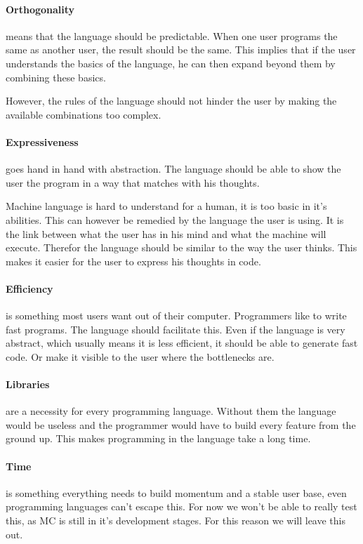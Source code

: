 \begin{multicols}{2}
   \paragraph{Orthogonality}
   means that the language should be predictable.
   When one user programs the same as another user, the result should be the same.
   This implies that if the user understands the basics of the language, he can then expand beyond them by combining these basics.

   However, the rules of the language should not hinder the user by making the available combinations too complex.

   \paragraph{Expressiveness}
   goes hand in hand with abstraction.
   The language should be able to show the user the program in a way that matches with his thoughts.

   Machine language is hard to understand for a human, it is too basic in it's abilities.
   This can however be remedied by the language the user is using.
   It is the link between what the user has in his mind and what the machine will execute.
   Therefor the language should be similar to the way the user thinks.
   This makes it easier for the user to express his thoughts in code.

   \paragraph{Efficiency}
   is something most users want out of their computer.
   Programmers like to write fast programs.
   The language should facilitate this.
   Even if the language is very abstract, which usually means it is less efficient\cite{graham2004hackers}, it should be able to generate fast code.
   Or make it visible to the user where the bottlenecks are.

   \paragraph{Libraries}
   are a necessity for every programming language.
   Without them the language would be useless and the programmer would have to build every feature from the ground up.
   This makes programming in the language take a long time.

   \paragraph{Time}
   is something everything needs to build momentum and a stable user base, even programming languages can't escape this.
   For now we won't be able to really test this, as MC is still in it's development stages.
   For this reason we will leave this out.


\end{multicols}
